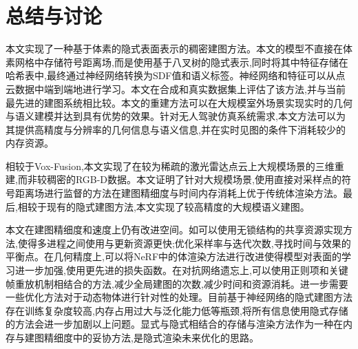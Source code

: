 \section{总结与讨论}\label{conclusion}

本文实现了一种基于体素的隐式表面表示的稠密建图方法。本文的模型不直接在体素网格中存储符号距离场,而是使用基于八叉树的隐式表示,同时将其中特征存储在哈希表中,最终通过神经网络转换为SDF值和语义标签。神经网络和特征可以从点云数据中端到端地进行学习。本文在合成和真实数据集上评估了该方法,并与当前最先进的建图系统相比较。本文的重建方法可以在大规模室外场景实现实时的几何与语义建模并达到具有优势的效果。针对无人驾驶仿真系统需求,本文方法可以为其提供高精度与分辨率的几何信息与语义信息,并在实时见图的条件下消耗较少的内存资源。

相较于Vox-Fusion,本文实现了在较为稀疏的激光雷达点云上大规模场景的三维重建,而非较稠密的RGB-D数据。本文证明了针对大规模场景,使用直接对采样点的符号距离场进行监督的方法在建图精细度与时间内存消耗上优于传统体渲染方法。最后,相较于现有的隐式建图方法,本文实现了较高精度的大规模语义建图。

本文在建图精细度和速度上仍有改进空间。如可以使用无锁结构的共享资源实现方法,使得多进程之间使用与更新资源更快;优化采样率与迭代次数,寻找时间与效果的平衡点。在几何精度上,可以将NeRF中的体渲染方法进行改进使得模型对表面的学习进一步加强,使用更先进的损失函数。在对抗网络遗忘上,可以使用正则项和关键帧重放机制相结合的方法,减少全局建图的次数,减少时间和资源消耗。进一步需要一些优化方法对于动态物体进行针对性的处理。目前基于神经网络的隐式建图方法存在训练复杂度较高,内存占用过大与泛化能力低等瓶颈,将所有信息使用隐式存储的方法会进一步加剧以上问题。显式与隐式相结合的存储与渲染方法作为一种在内存与建图精细度中的妥协方法,是隐式渲染未来优化的思路。
